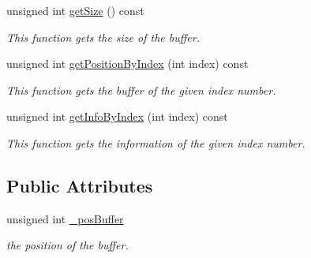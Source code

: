 \begin{CompactItemize}
unsigned int \hyperlink{classkmaOrange_1_1InfoBuffer_e94373995e74a292b9d243258eb1aab2}{getSize} () const 
\begin{CompactList}\small\item\em This function gets the size of the buffer. \item\end{CompactList}\item 
unsigned int \hyperlink{classkmaOrange_1_1InfoBuffer_75d7cc13e2eac9f1c1fa3322291663cb}{getPositionByIndex} (int index) const 
\begin{CompactList}\small\item\em This function gets the buffer of the given index number. \item\end{CompactList}\item 
unsigned int \hyperlink{classkmaOrange_1_1InfoBuffer_4065c2c4021fdd468e9d4a50fcabe671}{getInfoByIndex} (int index) const 
\begin{CompactList}\small\item\em This function gets the information of the given index number. \item\end{CompactList}\end{CompactItemize}
\subsection*{Public Attributes}
\begin{CompactItemize}
\item 
unsigned int \hyperlink{classkmaOrange_1_1InfoBuffer_99ad572af37af11ea1aeb7e82df01d18}{\_\-posBuffer}
\begin{CompactList}\small\item\em the position of the buffer. \item\end{CompactList}\end{CompactItemize}
